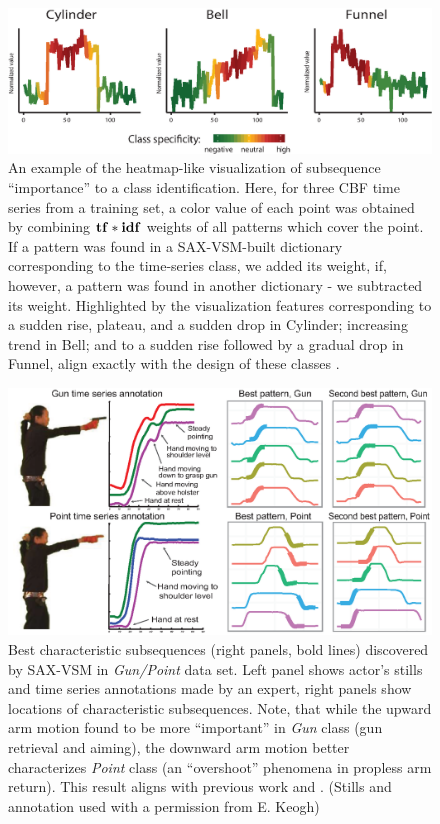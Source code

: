\begin{figure}[t]
   \centering
   \includegraphics[width=140mm]{figures/CBF-HEAT.eps}
   \caption{An example of the heatmap-like visualization of subsequence ``importance''
   to a class identification. 
   Here, for three CBF time series from a training set, a color value 
   of each point was obtained by combining $\text{\textbf{tf}}\ast\text{\textbf{idf}}$ weights of all patterns 
   which cover the point.
   If a pattern was found in a SAX-VSM-built dictionary corresponding to the 
   time-series class, we added its weight, if, however, a pattern was found in 
   another dictionary - we subtracted its weight. Highlighted by the visualization 
   features corresponding to a sudden rise, plateau, and a sudden drop in Cylinder;
   increasing trend in Bell;
   and to a sudden rise followed by a gradual drop in Funnel, align exactly with the
   design of these classes \cite{citeulike:12563781}.}
   \label{fig:heat}
\end{figure}

\begin{figure}[b]
   \centering
   \includegraphics[width=140mm]{figures/gun-point.eps}
   \caption{Best characteristic subsequences (right panels, bold lines) discovered by SAX-VSM in
   \textit{Gun/Point} data set. 
   Left panel shows actor's stills and time series annotations made by an expert, 
   right panels show locations of characteristic subsequences.
   Note, that while the upward arm motion found to be more ``important'' in \textit{Gun} 
   class (gun retrieval and aiming), the downward arm motion better characterizes 
   \textit{Point} class (an ``overshoot'' phenomena in propless arm return). 
   This result aligns with previous work \cite{citeulike:7344347} and \cite{citeulike:11345338}.
   (Stills and annotation used with a permission from E. Keogh) }
   \label{fig:shapelet-like-patterns}
\end{figure}

